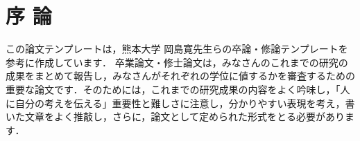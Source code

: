 \chapter{序 論}
この論文テンプレートは，熊本大学 岡島寛先生らの卒論・修論テンプレートを参考に作成しています\cite{卒論修論テンプレート}．
卒業論文・修士論文は，みなさんのこれまでの研究の成果をまとめて報告し，みなさんがそれぞれの学位に値するかを審査するための重要な論文です．そのためには，これまでの研究成果の内容をよく吟味し，「人に自分の考えを伝える」重要性と難しさに注意し，分かりやすい表現を考え，書いた文章をよく推敲し，さらに，論文として定められた形式をとる必要があります．
